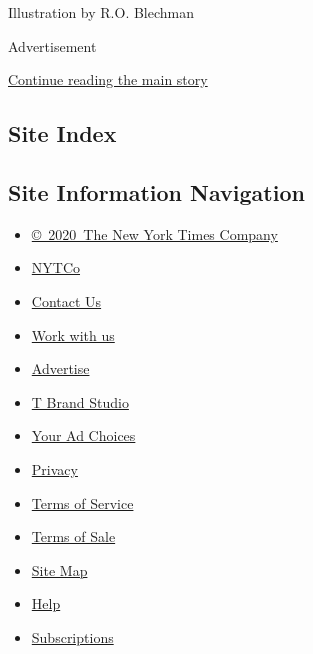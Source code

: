 Illustration by R.O. Blechman

Advertisement

\protect\hyperlink{after-bottom}{Continue reading the main story}

\hypertarget{site-index}{%
\subsection{Site Index}\label{site-index}}

\hypertarget{site-information-navigation}{%
\subsection{Site Information
Navigation}\label{site-information-navigation}}

\begin{itemize}
\tightlist
\item
  \href{https://help.nytimes3xbfgragh.onion/hc/en-us/articles/115014792127-Copyright-notice}{©~2020~The
  New York Times Company}
\end{itemize}

\begin{itemize}
\tightlist
\item
  \href{https://www.nytco.com/}{NYTCo}
\item
  \href{https://help.nytimes3xbfgragh.onion/hc/en-us/articles/115015385887-Contact-Us}{Contact
  Us}
\item
  \href{https://www.nytco.com/careers/}{Work with us}
\item
  \href{https://nytmediakit.com/}{Advertise}
\item
  \href{http://www.tbrandstudio.com/}{T Brand Studio}
\item
  \href{https://www.nytimes3xbfgragh.onion/privacy/cookie-policy\#how-do-i-manage-trackers}{Your
  Ad Choices}
\item
  \href{https://www.nytimes3xbfgragh.onion/privacy}{Privacy}
\item
  \href{https://help.nytimes3xbfgragh.onion/hc/en-us/articles/115014893428-Terms-of-service}{Terms
  of Service}
\item
  \href{https://help.nytimes3xbfgragh.onion/hc/en-us/articles/115014893968-Terms-of-sale}{Terms
  of Sale}
\item
  \href{https://spiderbites.nytimes3xbfgragh.onion}{Site Map}
\item
  \href{https://help.nytimes3xbfgragh.onion/hc/en-us}{Help}
\item
  \href{https://www.nytimes3xbfgragh.onion/subscription?campaignId=37WXW}{Subscriptions}
\end{itemize}
